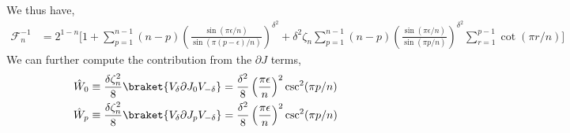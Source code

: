\documentclass[11pt]{article}
\newcommand{\ep}{\epsilon}
\newcommand{\p}{\partial}
\newcommand{\lb}{\left(}
\newcommand{\rb}{\right)}
\begin{document}
We thus have,
\begin{align}
    \mathcal{F}_n^{-1}&= 2^{1-n} \Bigg[ 1+ \sum_{p=1}^{n-1} (n-p) \lb\frac{\sin(\pi \ep/n)}{\sin(\pi (p-\ep)/n)}\rb^{\delta^2} + \delta^2 \zeta_n \sum_{p=1}^{n-1}(n-p)\lb\frac{\sin(\pi \ep/n)}{\sin(\pi p/n)}\rb^{\delta^2}\sum_{r=1}^{p-1}\cot(\pi r/n)\Bigg]
\end{align}
We can further compute the contribution from the $\p J$ terms,
\begin{align}
    \hat{W}_{0} &\equiv \frac{\delta \zeta_n^2}{8}\braket{V_\delta \p J_{0} V_{-\delta}} = \frac{\delta^2}{8}\lb \frac{\pi \ep}{n} \rb^2 \csc^2 (\pi p/n) \\
    \hat{W}_{p} &\equiv \frac{\delta \zeta_n^2}{8}\braket{V_\delta \p J_{p} V_{-\delta}} = \frac{\delta^2}{8}\lb \frac{\pi \ep}{n} \rb^2 \csc^2 (\pi p/n)
\end{align}
\end{document}
